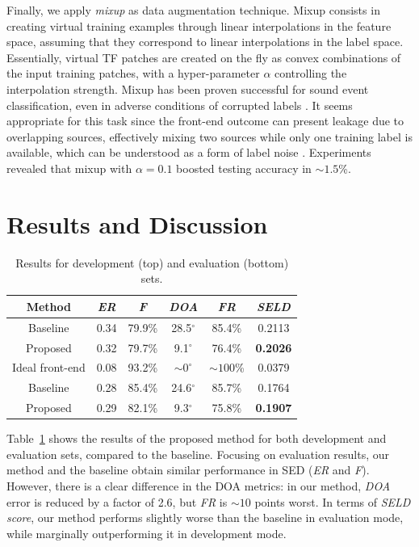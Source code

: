 Finally, we apply \textit{mixup} \cite{zhang2017mixup} as data augmentation technique.
Mixup consists in creating virtual training examples through linear interpolations in the feature space, assuming that they correspond to linear interpolations in the label space.
Essentially, virtual TF patches are created on the fly as convex combinations of the input training patches, with a hyper-parameter $\alpha$ controlling the interpolation strength.
Mixup has been proven successful for sound event classification, even in adverse conditions of corrupted labels \cite{Fonseca2019model}.
It seems appropriate for this task since the front-end outcome can present leakage due to overlapping sources, effectively mixing two sources while only one training label is available, which can be understood as a form of label noise \cite{Fonseca2019learning}.
Experiments revealed that mixup with $\alpha=0.1$ boosted testing accuracy in $\sim1.5$\%. 







\section{Results and Discussion}
\label{sec:results}
\begin{table}[!htbp]
\centering
\caption{Results for development (top) and evaluation (bottom) sets.}

\begin{tabular}{cccccc}
\toprule
Method & \textit{ER} & \textit{F} & \textit{DOA} & \textit{FR} & \textbf{\textit{SELD}}\\
\midrule
Baseline & 0.34 & 79.9\% & 28.5$^{\circ}$  & 85.4\% & 0.2113\\
Proposed & 0.32 & 79.7\% & 9.1$^{\circ}$   & 76.4\% & \textbf{0.2026}\\
Ideal front-end & 0.08 & 93.2\% & $\sim0^{\circ}$   &$ \sim100$\% & 0.0379\\
\midrule
Baseline & 0.28 & 85.4\% & 24.6$^{\circ}$  & 85.7\% &  0.1764\\
Proposed & 0.29 & 82.1\% & 9.3$^{\circ}$   & 75.8\% & \textbf{ 0.1907}\\
\bottomrule
\end{tabular}
\label{tab:results_real}
\end{table}


Table~\ref{tab:results_real} shows the results of the proposed method for both development and evaluation sets, compared to the baseline.
Focusing on evaluation results, our method and the baseline obtain similar performance in SED (\textit{ER} and \textit{F}). However, there is a clear difference in the DOA metrics:
in our method, \textit{DOA} error is reduced by a factor of 2.6, but \textit{FR}  is $\sim10$ points worst.
In terms of \textit{SELD score}, our method performs slightly worse than the baseline in evaluation mode, while marginally outperforming it in development mode. 

